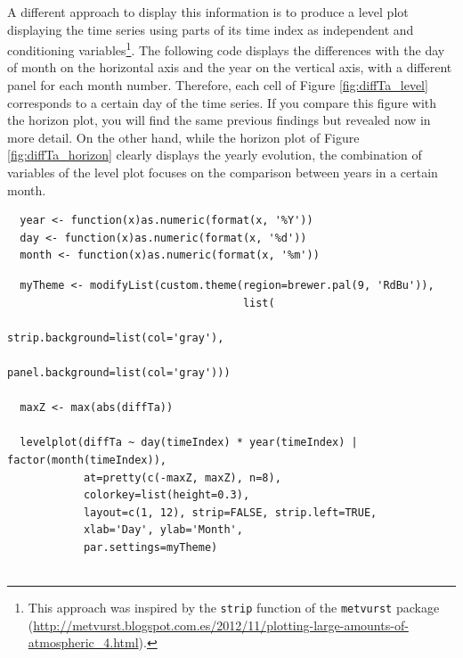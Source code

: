 \documentclass[smallroyalvopaper]{memoir}
\begin{document}
A different approach to display this information is to produce a level
plot displaying the time series using parts of its time index as
independent and conditioning variables\footnote{This approach was inspired by the \texttt{strip} function of the
\texttt{metvurst} package
(\url{http://metvurst.blogspot.com.es/2012/11/plotting-large-amounts-of-atmospheric\_4.html}).}. The following code
displays the differences with the day of month on the horizontal axis
and the year on the vertical axis, with a different panel for each
month number. Therefore, each cell of Figure \ref{fig:diffTa_level}
corresponds to a certain day of the time series. If you compare this
figure with the horizon plot, you will find the same previous findings
but revealed now in more detail. On the other hand, while the horizon
plot of Figure \ref{fig:diffTa_horizon} clearly displays the yearly
evolution, the combination of variables of the level plot focuses on
the comparison between years in a certain month.

\lstset{language=r,label= ,caption= ,captionpos=b,numbers=none}
\begin{lstlisting}
  year <- function(x)as.numeric(format(x, '%Y'))
  day <- function(x)as.numeric(format(x, '%d'))
  month <- function(x)as.numeric(format(x, '%m'))
\end{lstlisting}

\lstset{language=r,label= ,caption= ,captionpos=b,numbers=none}
\begin{lstlisting}
  myTheme <- modifyList(custom.theme(region=brewer.pal(9, 'RdBu')),
                                     list(
                                       strip.background=list(col='gray'),
                                       panel.background=list(col='gray')))
  
  maxZ <- max(abs(diffTa))
  
  levelplot(diffTa ~ day(timeIndex) * year(timeIndex) | factor(month(timeIndex)),
            at=pretty(c(-maxZ, maxZ), n=8),
            colorkey=list(height=0.3),
            layout=c(1, 12), strip=FALSE, strip.left=TRUE,
            xlab='Day', ylab='Month', 
            par.settings=myTheme)
  
\end{lstlisting}
\end{document}
